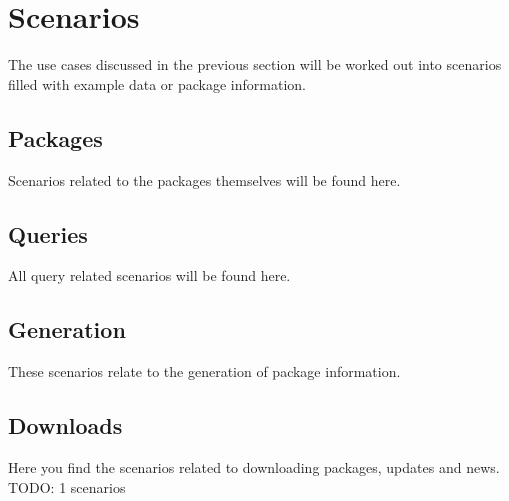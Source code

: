 \newpage
\section{Scenarios}  
The use cases discussed in the previous section will be worked out into scenarios filled with example data or package information.


\subsection{Packages}
Scenarios related to the packages themselves will be found here.










\subsection{Queries}
All query related scenarios will be found here.















\subsection{Generation}
These scenarios relate to the generation of package information.





\subsection{Downloads}
Here you find the scenarios related to downloading packages, updates and news.
TODO: 1 scenarios


